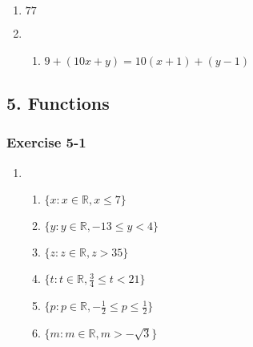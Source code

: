 {\begin{multicols}{3}
\begin{enumerate}[noitemsep, label=\textbf{\arabic*}. ]
\item $77$%
%      
 
\item %

  \begin{enumerate}[noitemsep, label=\textbf{(\alph*)} ]
      \setcounter{enumii_saved}{\value{enumii}}
\setcounter{enumii}{2}
  \item $9+(10x+y)=10(x+1)+(y-1)$%
  \end{enumerate}

\end{enumerate}
\end{multicols}


\subsection* {5. Functions}
\begin{multicols}{3}
\subsubsection*{Exercise 5-1} %

\begin{enumerate}[noitemsep, label=\textbf{\arabic*}. ] 


\item %
\begin{enumerate}[noitemsep, label=\textbf{(\alph*)} ] 
 \item $\{x:x\in\mathbb{R}, x\leq7\}$ %
\item $\{y:y\in\mathbb{R}, -13 \leq y<4\}$ %
\item $\{z:z\in\mathbb{R}, z>35\}$ %
\item $\{t:t\in\mathbb{R}, \frac{3}{4}\leq t <21\}$ %
\item $\{p:p\in\mathbb{R}, -\frac{1}{2}\leq p \leq \frac{1}{2}\}$ %
\item $\{m:m\in\mathbb{R}, m > -\sqrt{3}\}$  %
\end{enumerate}


\end{enumerate}
\end{multicols}}
